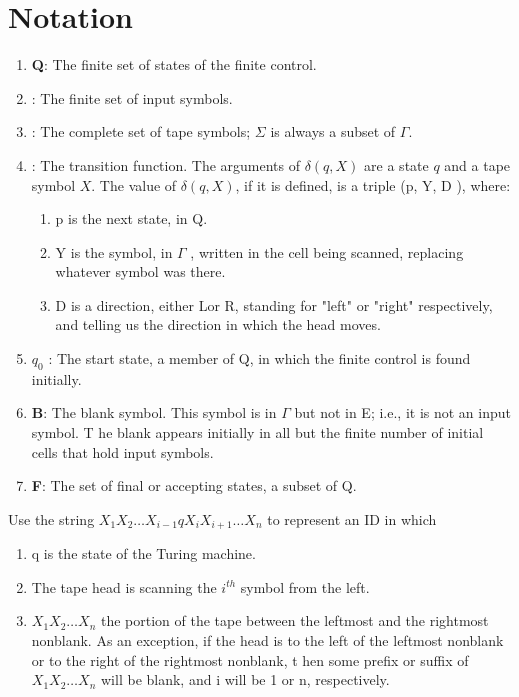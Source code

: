 \documentclass[a4paper,oneside]{book}
\begin{document}
\section{Notation}
\begin{enumerate}
\item \textbf{Q}: The finite set of states of the finite control.
\item \boldmath{$\Sigma$}: The finite set of input symbols.
\item \boldmath{$\Gamma$}:  The complete set of tape symbols; $\Sigma$ is always a subset of $\Gamma$.
\item \boldmath{$\delta$}: The transition function. The arguments of $\delta(q, X)$ are a state $q$ and a
tape symbol $X$. The value of $\delta(q, X)$, if it is defined, is a triple (p, Y, D ), where:\begin{enumerate}
\item  p is the next state, in Q.
\item Y is the symbol, in $\Gamma$ , written in the cell being scanned, replacing whatever symbol was there.
\item  D is a direction, either Lor R, standing for "left" or "right" respectively, and telling us the direction in which the head moves.
\end{enumerate}
\item {\boldmath$q_0$} : The start state, a member of Q, in which the finite control is found initially.
\item \textbf{B}: The blank symbol. This symbol is in $\Gamma$ but not in E; i.e., it is not an input symbol. T he blank appears initially in all but the finite number of initial cells that hold input symbols.
\item \textbf{F}: The set of final or accepting states, a subset of Q.
\end{enumerate}
 Use the string $X_1X_2\ldots X_{i- 1}qX_iX_{ i+1}\ldots X_n$ to represent an ID in which
\begin{enumerate}
\item  q is the state of the Turing machine.
\item  The tape head is scanning the $i^{th}$ symbol from the left.
\item $X_1X_2\ldots X_n$ the portion of the tape between the leftmost and the rightmost nonblank. As an exception, if the head is to the left of the leftmost nonblank or to the right of the rightmost nonblank, t hen some prefix or suffix of $X_1X_2\ldots X_n$ will be blank, and i will be 1 or n, respectively.
\end{enumerate}
\end{document}
